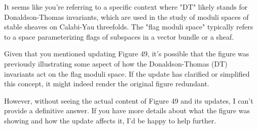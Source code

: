 It seems like you're referring to a specific context where "DT" likely stands for Donaldson-Thomas invariants, which are used in the study of moduli spaces of stable sheaves on Calabi-Yau threefolds. The "flag moduli space" typically refers to a space parameterizing flags of subspaces in a vector bundle or a sheaf.

Given that you mentioned updating Figure 49, it's possible that the figure was previously illustrating some aspect of how the Donaldson-Thomas (DT) invariants act on the flag moduli space. If the update has clarified or simplified this concept, it might indeed render the original figure redundant.

However, without seeing the actual content of Figure 49 and its updates, I can't provide a definitive answer. If you have more details about what the figure was showing and how the update affects it, I'd be happy to help further.